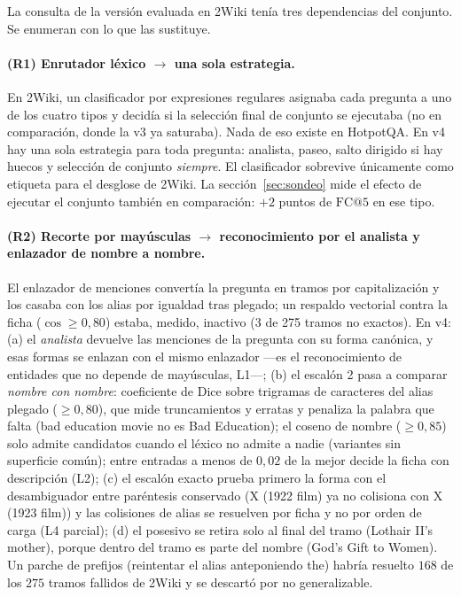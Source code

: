 \documentclass[11pt,a4paper]{article}
\newcommand{\gl}{\guillemotleft}
\newcommand{\gr}{\guillemotright}
\begin{document}
La consulta de la versión evaluada en 2Wiki tenía tres dependencias del
conjunto. Se enumeran con lo que las sustituye.

\paragraph{(R1) Enrutador léxico $\to$ una sola estrategia.}
En 2Wiki, un clasificador por expresiones regulares asignaba cada pregunta a
uno de los cuatro tipos y decidía si la selección final de conjunto se
ejecutaba (no en comparación, donde la v3 ya saturaba). Nada de eso existe
en HotpotQA. En v4 hay una sola estrategia para toda pregunta: analista,
paseo, salto dirigido si hay huecos y selección de conjunto \emph{siempre}.
El clasificador sobrevive únicamente como etiqueta para el desglose de
2Wiki. La sección~\ref{sec:sondeo} mide el efecto de ejecutar el conjunto
también en comparación: $+2$ puntos de $\mathrm{FC@}5$ en ese tipo.

\paragraph{(R2) Recorte por mayúsculas $\to$ reconocimiento por el analista y enlazador de nombre a nombre.}
El enlazador de menciones convertía la pregunta en tramos por capitalización
y los casaba con los alias por igualdad tras plegado; un respaldo vectorial
contra la ficha ($\cos \ge 0{,}80$) estaba, medido, inactivo (3 de 275
tramos no exactos). En v4: (a) el \emph{analista} devuelve las menciones de
la pregunta con su forma canónica, y esas formas se enlazan con el mismo
enlazador ---es el reconocimiento de entidades que no depende de mayúsculas,
L1---; (b) el escalón 2 pasa a comparar \emph{nombre con nombre}: coeficiente
de Dice sobre trigramas de caracteres del alias plegado ($\ge 0{,}80$), que
mide truncamientos y erratas y penaliza la palabra que falta (\gl{}bad
education movie\gr{} no es \gl{}Bad Education\gr{}); el coseno de nombre
($\ge 0{,}85$) solo admite candidatos cuando el léxico no admite a nadie
(variantes sin superficie común); entre entradas a menos de $0{,}02$ de la
mejor decide la ficha con descripción (L2); (c) el escalón exacto prueba
primero la forma con el desambiguador entre paréntesis conservado (\gl{}X
(1922 film)\gr{} ya no colisiona con \gl{}X (1923 film)\gr{}) y las
colisiones de alias se resuelven por ficha y no por orden de carga (L4
parcial); (d) el posesivo se retira solo al final del tramo (\gl{}Lothair
II's mother\gr{}), porque dentro del tramo es parte del nombre (\gl{}God's
Gift to Women\gr{}). Un parche de prefijos (reintentar el alias anteponiendo
\gl{}the\gr{}) habría resuelto $168$ de los $275$ tramos fallidos de 2Wiki y
se descartó por no generalizable.
\end{document}
